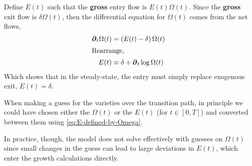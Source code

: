 \documentclass[11pt]{article}
\newcommand{\D}[1][]{\ensuremath{\boldsymbol{\partial}_{#1}}}
\begin{document}
Define $E(t)$ such that the \textbf{gross} entry flow is $E(t)\Omega(t)$.  Since the \textbf{gross} exit flow is $\delta \Omega(t)$, then the differential equation for $\Omega(t)$ comes from the net flows,
\begin{align} 
	\D[t] \Omega(t) &= \left(E(t) - \delta \right)\Omega(t)\label{eq:E-defined-by-Omega}\\
	\intertext{Rearrange,}
	E(t) &\equiv \delta + \D[t]\log \Omega(t)
\end{align}
Which shows that in the steady-state, the entry must simply replace exogenous exit, $E(t) = \delta$.

When making a guess for the varieties over the transition path, in principle we could have chosen either the $\Omega(t)$ or the $E(t)$ (for $t \in [0,T]$) and converted between them using \cref{eq:E-defined-by-Omega}.

In practice, though, the model does not solve effectively with guesses on $\Omega(t)$ since small changes in the guess can lead to large deviations in $E(t)$, which enter the growth calculations directly.
\end{document}
